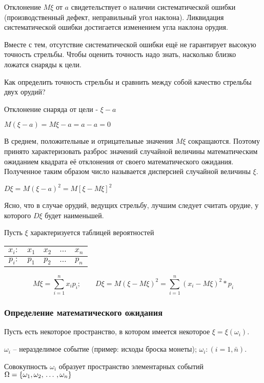 ﻿\documentclass[a4paper,12pt]{report}
\begin{document}
	Отклонение $M\xi$ от $a$ свидетельствует о наличии систематической ошибки (производственный дефект, неправильный угол наклона). Ликвидация систематической ошибки достигается изменением угла наклона орудия. 

	Вместе с тем, отсутствие систематической ошибки ещё не гарантирует высокую точность стрельбы. Чтобы оценить точность надо знать, насколько близко ложатся снаряды к цели. 

	Как определить точность стрельбы и сравнить между собой качество стрельбы двух орудий?

	Отклонение снаряда от цели - $\xi - a$
	
	$M(\xi - a) = M\xi - a = a - a = 0$

	В среднем, положительные и отрицательные значения $M\xi$ сокращаются. Поэтому принято характеризовать разброс значений случайной величины математическим ожиданием квадрата её отклонения от своего математического ожидания. Полученное таким образом число называется дисперсией случайной величины $\xi$. 

	$D\xi = M(\xi-a)^2 = M[\xi-M\xi]^2$

	Ясно, что в случае орудий, ведущих стрельбу, лучшим следует считать орудие, у которого $D\xi$ будет наименьшей.

	Пусть $\xi$ характеризуется таблицей вероятностей \strut


	\begin{tabular}{|r|c|c|c|c|}
	\hline
		$x_i:$ & $x_1$ & $x_2$ & $\ldots$ & $x_n$\\
	\hline	
		$p_i:$ & $p_1$ & $p_2$ & $\ldots$ & $p_n$\\
	\hline
	\end{tabular}

	
	$$
	  M\xi = \sum^n_{i=1}x_ip_i;
	  \qquad
	  D\xi = M (\xi - M\xi)^2 
	       = \sum^n_{i=1}(x_i-M\xi)^2*p_i
	$$



\subsubsection{Определение математического ожидания}

	Пусть есть некоторое пространство, в котором имеется некоторое $\xi = \xi(\omega_i)$.

	$\omega_i$ – неразделимое событие (пример: исходы броска монеты); $\omega_i:(i=1,\bar n)$.

	Совокупность $\omega_i$ образует пространство элементарных событий
	$\Omega = \{ \omega_1, \omega_2, \,\ldots\,, \omega_n \}$
\end{document}
